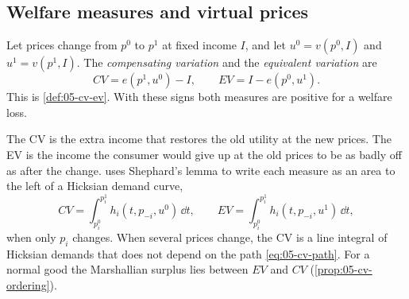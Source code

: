 \subsection{Welfare measures and virtual prices}\label{sec:B-welfare}

\begin{definition}\label{def:B-cv-ev}
Let prices change from $p^0$ to $p^1$ at fixed income $I$, and let $u^0 = v(p^0, I)$ and $u^1 = v(p^1, I)$.
The \emph{compensating variation} and the \emph{equivalent variation} are
\begin{equation}\label{eq:B-cv-ev}
CV = e(p^1, u^0) - I, \qquad EV = I - e(p^0, u^1).
\end{equation}
This is \cref{def:05-cv-ev}. With these signs both measures are positive for a welfare loss.
\end{definition}

The CV is the extra income that restores the old utility at the new prices. The EV is the income the
consumer would give up at the old prices to be as badly off as after the change.  uses
Shephard's lemma to write each measure as an area to the left of a Hicksian demand curve,
\begin{equation}\label{eq:B-cv-integral}
CV = \int_{p_i^0}^{p_i^1}h_i(t, p_{-i}, u^0)\,\dd t, \qquad EV = \int_{p_i^0}^{p_i^1}h_i(t, p_{-i}, u^1)\,\dd t ,
\end{equation}
when only $p_i$ changes. When several prices change, the CV is a line integral of Hicksian demands that does not
depend on the path \eqref{eq:05-cv-path}. For a normal good the Marshallian surplus lies between $EV$ and $CV$
(\cref{prop:05-cv-ordering}).

